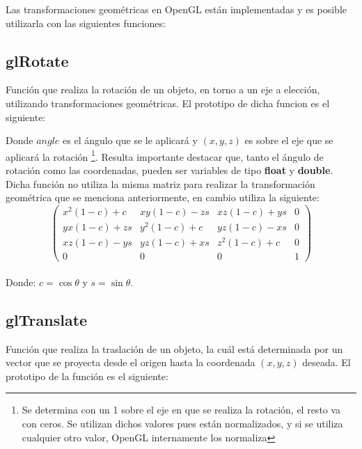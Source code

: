 \documentclass[journal]{IEEEtran}
\begin{document}
Las transformaciones geométricas en OpenGL están implementadas y es posible utilizarla con las siguientes funciones:

\subsection{glRotate}

Función que realiza la rotación de un objeto, en torno a un eje a elección, utilizando transformaciones geométricas\cite{glrotate}. El prototipo de dicha funcion es el siguiente:

 

Donde $angle$ es el ángulo que se le aplicará y $(x,y,z)$ es sobre el eje que se aplicará la rotación \footnote{Se determina con un 1 sobre el eje en que se realiza la rotación, el resto va con ceros. Se utilizan dichos valores pues están normalizados, y si se utiliza cualquier otro valor, OpenGL internamente los normaliza}. Resulta importante destacar que, tanto el ángulo de rotación como las coordenadas, pueden ser variables de tipo \textbf{float} y \textbf{double}.\\

Dicha función no utiliza la misma matriz para realizar la transformación geométrica que se menciona anteriormente, en cambio utiliza la siguiente:\\

\[
	\left( 
		\begin{array}{cccc}
			x^{2}(1-c)+c & xy(1-c)-zs & xz(1-c)+ys & 0 \\
			yx(1-c)+zs & y^{2}(1-c)+c & yz(1-c)-xs & 0 \\
			xz(1-c)-ys & yz(1-c)+xs & z^{2}(1-c)+c & 0 \\
			0 & 0 & 0 & 1
		\end{array}
	\right)
\]\\

Donde: $c = \cos\theta$ y $s=\sin\theta$.

\subsection{glTranslate}

Función que realiza la traslación de un objeto, la cuál está determinada por un vector que se proyecta desde el origen hasta la coordenada $(x,y,z)$ deseada\cite{gltranslate}. El prototipo de la función es el siguiente:

 
\end{document}
